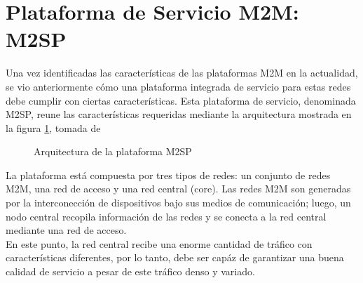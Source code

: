 \documentclass[journal]{IEEEtran}
\begin{document}
\section{Plataforma de Servicio M2M: M2SP}

Una vez identificadas las características de las plataformas M2M en la actualidad, se vio anteriormente cómo una plataforma integrada de servicio para estas redes debe cumplir con ciertas características. Esta plataforma de servicio, denominada M2SP, reune las características requeridas mediante la arquitectura mostrada en la figura \ref{arqM2SP}, tomada de \cite{paper1} 

\begin{figure}[h]
\centering
{}
\caption{Arquitectura de la plataforma M2SP}
\label{arqM2SP}
\end{figure}

La plataforma está compuesta por tres tipos de redes: un conjunto de redes M2M, una red de acceso y una red central (core). Las redes M2M son generadas por la interconección de dispositivos bajo sus medios de comunicación; luego, un nodo central recopila información de las redes y se conecta a la red central mediante una red de acceso.\\

En este punto, la red central recibe una enorme cantidad de tráfico con características diferentes, por lo tanto, debe ser capáz de garantizar una buena calidad de servicio a pesar de este tráfico denso y variado.\\
\end{document}
